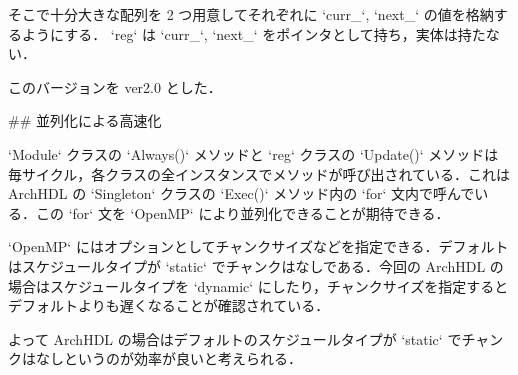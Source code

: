 そこで十分大きな配列を 2 つ用意してそれぞれに `curr_`, `next_` の値を格納するようにする．
`reg` は `curr_`, `next_` をポインタとして持ち，実体は持たない．

このバージョンを ver2.0 とした．




## 並列化による高速化 \label{ss:parallel}

`Module` クラスの `Always()` メソッドと
`reg` クラスの `Update()` メソッドは毎サイクル，各クラスの全インスタンスでメソッドが呼び出されている．これは
ArchHDL の `Singleton` クラスの `Exec()` メソッド内の
`for` 文内で呼んでいる．この
`for` 文を `OpenMP` により並列化できることが期待できる．

`OpenMP` にはオプションとしてチャンクサイズなどを指定できる．デフォルトはスケジュールタイプが
`static` でチャンクはなしである．今回の ArchHDL の場合はスケジュールタイプを `dynamic`
にしたり，チャンクサイズを指定するとデフォルトよりも遅くなることが確認されている．

よって ArchHDL の場合はデフォルトのスケジュールタイプが `static` でチャンクはなしというのが効率が良いと考えられる．

